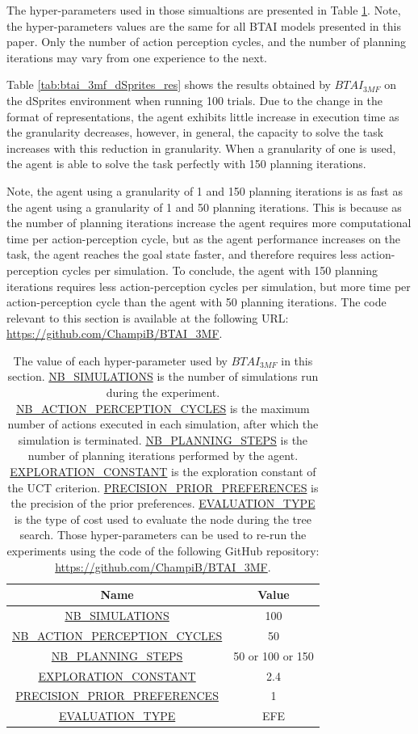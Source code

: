 \documentclass[twoside,11pt]{article}
\begin{document}
The hyper-parameters used in those simualtions are presented in Table \ref{tab:values_hp_BTAI_3MF_dSprites}. Note, the hyper-parameters values are the same for all BTAI models presented in this paper. Only the number of action perception cycles, and the number of planning iterations may vary from one experience to the next.

Table \ref{tab:btai_3mf_dSprites_res} shows the results obtained by $BTAI_{3MF}$ on the dSprites environment when running 100 trials. Due to the change in the format of representations, the agent exhibits little increase in execution time as the granularity decreases, however, in general, the capacity to solve the task increases with this reduction in granularity. When a granularity of one is used, the agent is able to solve the task perfectly with 150 planning iterations.

Note, the agent using a granularity of 1 and 150 planning iterations is as fast as the agent using a granularity of 1 and 50 planning iterations. This is because as the number of planning iterations increase the agent requires more computational time per action-perception cycle, but as the agent performance increases on the task, the agent reaches the goal state faster, and therefore requires less action-perception cycles per simulation. To conclude, the agent with 150 planning iterations requires less action-perception cycles per simulation, but more time per action-perception cycle than the agent with 50 planning iterations. The code relevant to this section is available at the following URL: \url{https://github.com/ChampiB/BTAI_3MF}.


\begin{table}[H]
\centering
\begin{tabular}{ |c|c|  }
 \hline
 Name & Value\\
 \hline
 \hline
 \url{NB_SIMULATIONS} & 100\\
 \hline
 \url{NB_ACTION_PERCEPTION_CYCLES} & 50\\
 \hline
 \url{NB_PLANNING_STEPS} & 50 or 100 or 150\\
 \hline
 \url{EXPLORATION_CONSTANT} & 2.4\\
 \hline
 \url{PRECISION_PRIOR_PREFERENCES} & 1\\
 \hline
 \url{EVALUATION_TYPE} & EFE\\
 \hline
\end{tabular}
\caption{The value of each hyper-parameter used by $BTAI_{3MF}$ in this section. \url{NB_SIMULATIONS} is the number of simulations run during the experiment. \url{NB_ACTION_PERCEPTION_CYCLES} is the maximum number of actions executed in each simulation, after which the simulation is terminated. \url{NB_PLANNING_STEPS} is the number of planning iterations performed by the agent. \url{EXPLORATION_CONSTANT} is the exploration constant of the UCT criterion. \url{PRECISION_PRIOR_PREFERENCES} is the precision of the prior preferences. \url{EVALUATION_TYPE} is the type of cost used to evaluate the node during the tree search. Those hyper-parameters can be used to re-run the experiments using the code of the following GitHub repository: \url{https://github.com/ChampiB/BTAI_3MF}.}
\label{tab:values_hp_BTAI_3MF_dSprites}
\end{table}
\end{document}
